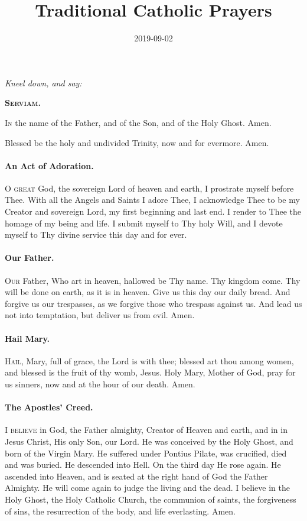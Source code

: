 \documentclass{article}
\title{Traditional Catholic Prayers}
\date{2019-09-02}
\begin{document}
\justify

\begin{multicols}{3}

\textit{Kneel down, and say:}

\textbf{\textsc{Serviam.}}

\textsc{In} the name of the Father, and of the Son, and of the Holy Ghost.
Amen.

Blessed be the holy and undivided Trinity, now and for evermore.
Amen.

\paragraph{An Act of Adoration.}
\textsc{O great} God, the sovereign Lord of heaven and earth, I prostrate
myself before Thee.  With all the Angels and Saints I adore
Thee, I acknowledge Thee to be my Creator and sovereign Lord,
my first beginning and last end.  I render to Thee the homage
of my being and life.  I submit myself to Thy holy Will,
and I devote myself to Thy divine service this day and for
ever.

\paragraph{Our Father.}
\textsc{Our} Father, Who art in heaven, hallowed be Thy name.
Thy kingdom come.  Thy will be done on earth, as it is in heaven.
Give us this day our daily bread.  And forgive us our trespasses,
as we forgive those who trespass against us.  And lead us not
into temptation, but deliver us from evil.  Amen.

\paragraph{Hail Mary.}
\textsc{Hail}, Mary, full of grace, the Lord is with thee;
blessed art thou among women, and blessed is the fruit of
thy womb, Jesus.  Holy Mary, Mother of God, pray for us sinners,
now and at the hour of our death. Amen.

\paragraph{The Apostles' Creed.}
\textsc{I believe} in God, the Father almighty, Creator of Heaven and earth,
and in in Jesus Christ, His only Son, our Lord. He was conceived by
the Holy Ghost, and born of the Virgin Mary. He suffered under Pontius
Pilate, was crucified, died and was buried. He descended into Hell.
On the third day He rose again. He ascended into Heaven, and is seated
at the right hand of God the Father Almighty. He will come again to
judge the living and the dead. I believe in the Holy Ghost, the Holy
Catholic Church, the communion of saints, the forgiveness of sins, the
resurrection of the body, and life everlasting. Amen. 


\end{multicols}
\end{document}
